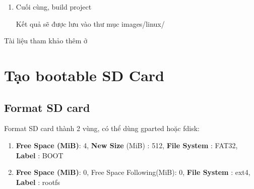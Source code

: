 \documentclass[a4paper]{report}
\begin{document}
\begin{enumerate}
\item Cuối cùng, build project
Kết quả sẽ được lưu vào thư mục images/linux/
\end{enumerate}
Tài liệu tham khảo thêm ở \cite{peta1, peta2, peta3, peta4}
\section{Tạo bootable SD Card}
\label{section:sdcard}
\subsection{Format SD card}
Format SD card thành 2 vùng, có thể dùng gparted hoặc fdisk:
\begin{enumerate}
\item \textbf{Free Space (MiB)}: 4, \textbf{New Size} (MiB) : 512, \textbf{File System} : FAT32, \textbf{Label} : BOOT
\item \textbf{Free Space (MiB)}: 0, Free Space Following(MiB): 0, \textbf{File System} : ext4, \textbf{Label} : rootfs
\end{enumerate}
\end{document}
